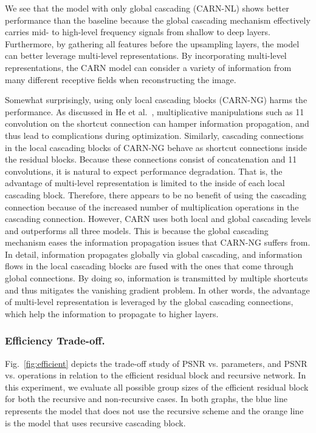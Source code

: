 \documentclass[runningheads]{llncs}
\begin{document}
We see that the model with only global cascading (CARN-NL) shows better performance than the baseline because the global cascading mechanism effectively carries mid- to high-level frequency signals from shallow to deep layers. Furthermore, by gathering all features before the upsampling layers, the model can better leverage multi-level representations. By incorporating multi-level representations, the CARN model can consider a variety of information from many different receptive fields when reconstructing the image.

Somewhat surprisingly, using only local cascading blocks (CARN-NG) harms the performance. As discussed in He et al.~\cite{he2016identity}, multiplicative manipulations such as 11 convolution on the shortcut connection can hamper information propagation, and thus lead to complications during optimization. Similarly, cascading connections in the local cascading blocks of CARN-NG behave as shortcut connections inside the residual blocks. Because these connections consist of concatenation and 11 convolutions, it is natural to expect performance degradation. That is, the advantage of multi-level representation is limited to the inside of each local cascading block. Therefore, there appears to be no benefit of using the cascading connection because of the increased number of multiplication operations in the cascading connection. However, CARN uses both local and global cascading levels and outperforms all three models. This is because the global cascading mechanism eases the information propagation issues that CARN-NG suffers from. In detail, information propagates globally via global cascading, and information flows in the local cascading blocks are fused with the ones that come through global connections. By doing so, information is transmitted by multiple shortcuts and thus mitigates the vanishing gradient problem. In other words, the advantage of multi-level representation is leveraged by the global cascading connections, which help the information to propagate to higher layers.

\subsubsection{Efficiency Trade-off.}
Fig.~\ref{fig:efficient} depicts the trade-off study of PSNR vs. parameters, and PSNR vs. operations in relation to the efficient residual block and recursive network. In this experiment, we evaluate all possible group sizes of the efficient residual block for both the recursive and non-recursive cases. In both graphs, the blue line represents the model that does not use the recursive scheme and the orange line is the model that uses recursive cascading block.
\end{document}
